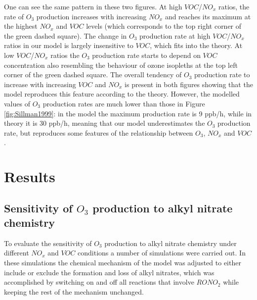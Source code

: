 \documentclass[11pt,a4paper]{article}
\begin{document}
One can see the same pattern in these two figures. At high $VOC$/$NO_x$ ratios, the rate of $O_3$ production increases with increasing $NO_x$ and reaches its maximum at the highest $NO_x$ and $VOC$ levels (which corresponds to the top right corner of the green dashed square). The change in $O_3$ production rate at high $VOC$/$NO_x$ ratios in our model is largely insensitive to $VOC$, which fits into the theory. At low $VOC$/$NO_x$ ratios the $O_3$ production rate starts to depend on $VOC$ concentration also resembling the behaviour of ozone isopleths at the top left corner of the green dashed square. The overall tendency of $O_3$ production rate to increase with increasing $VOC$ and $NO_x$ is present in both figures showing that the model reproduces this feature according to the theory. However, the modelled values of $O_3$ production rates are much lower than those in Figure \ref{fig:Sillman1999}: in the model the maximum production rate is 9 ppb/h, while in theory it is 30 ppb/h, meaning that our model underestimates the $O_3$ production rate, but reproduces some features of the relationship between $O_3$, $NO_x$ and $VOC$.

\section{Results} \label{sec:res}
\subsection{Sensitivity of $O_3$ production to alkyl nitrate chemistry}\label{sec:res_O3ANsensetivity}

To evaluate the sensitivity of $O_3$ production to alkyl nitrate chemistry under different $NO_x$ and $VOC$ conditions a number of simulations were carried out. In these simulations the chemical mechanism of the model was adjusted to either include or exclude the formation and loss of alkyl nitrates, which was accomplished by switching on and off all reactions that involve $RONO_2$ while keeping the rest of the mechanism unchanged. 
\end{document}
